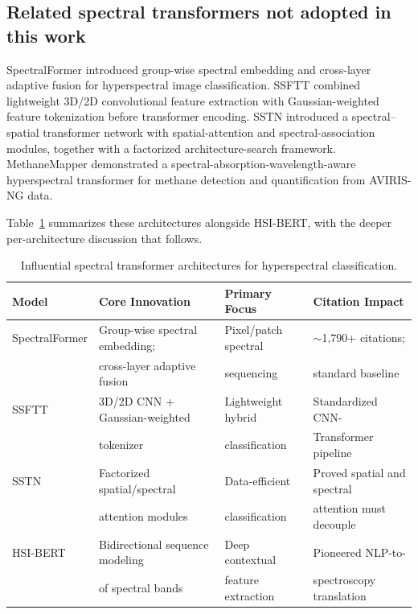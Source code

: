 \documentclass[11pt]{report}
\begin{document}
\subsection{Related spectral transformers not adopted in this work}

SpectralFormer \cite{hong2021spectralformer} introduced group-wise spectral embedding and cross-layer adaptive fusion for hyperspectral image classification.
SSFTT \cite{sun2022ssftt} combined lightweight 3D/2D convolutional feature extraction with Gaussian-weighted feature tokenization before transformer encoding.
SSTN \cite{zhong2021sstn} introduced a spectral--spatial transformer network with spatial-attention and spectral-association modules, together with a factorized architecture-search framework.
MethaneMapper \cite{kumar2023methanemapper} demonstrated a spectral-absorption-wavelength-aware hyperspectral transformer for methane detection and quantification from AVIRIS-NG data.

Table~\ref{tab:spectral_transformers} summarizes these architectures alongside HSI-BERT, with the deeper per-architecture discussion that follows.

\begin{table}[htbp]
\centering
\caption{Influential spectral transformer architectures for hyperspectral classification.}
\label{tab:spectral_transformers}
\begin{tabular}{llll}
\hline
\textbf{Model} & \textbf{Core Innovation} & \textbf{Primary Focus} & \textbf{Citation Impact} \\
\hline
SpectralFormer & Group-wise spectral embedding; & Pixel/patch spectral & $\sim$1,790+ citations; \\
 & cross-layer adaptive fusion & sequencing & standard baseline \\
\hline
SSFTT & 3D/2D CNN + Gaussian-weighted & Lightweight hybrid & Standardized CNN- \\
 & tokenizer & classification & Transformer pipeline \\
\hline
SSTN & Factorized spatial/spectral & Data-efficient & Proved spatial and spectral \\
 & attention modules & classification & attention must decouple \\
\hline
HSI-BERT & Bidirectional sequence modeling & Deep contextual & Pioneered NLP-to- \\
 & of spectral bands & feature extraction & spectroscopy translation \\
\hline
\end{tabular}
\end{table}
\end{document}
